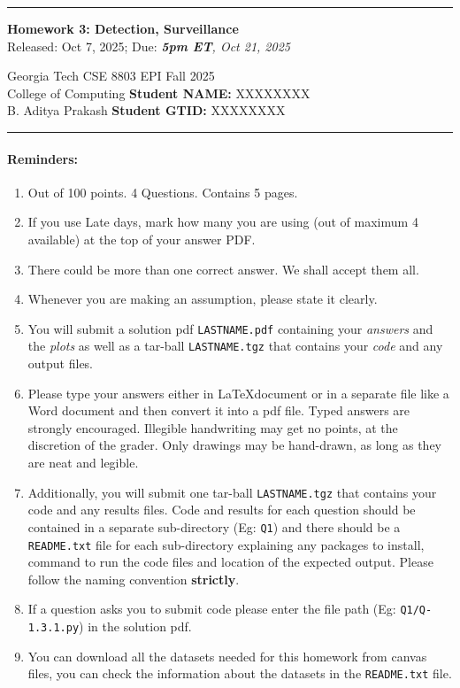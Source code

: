 \documentclass[addpoints,11pt,a4paper]{exam}
\begin{document}
\hrule height 1pt \vskip1pc
\begin{center}
    {\sf \LARGE \textbf{Homework 3: Detection, Surveillance}}\\
    Released: Oct 7, 2025; Due: \emph{{\bf 5pm ET}, Oct 21, 2025}
\end{center}

\noindent
{\sf Georgia Tech \hfill CSE 8803 EPI Fall 2025\\
    College of Computing \hfill {\bf Student NAME:} XXXXXXXX\\
    B. Aditya Prakash \hfill {\bf Student GTID:} XXXXXXXX}

\hrule height 1pt \vskip1pc



\paragraph{Reminders:}
{\it \footnotesize
    \begin{enumerate}
        \item Out of 100 points. 4 Questions. Contains 5 pages.

        \item If you use Late days, mark how many you are using (out of maximum 4 available) at the top of your answer PDF.
        \item There could be more than one correct answer. We shall accept them all.
        \item Whenever you are making an assumption, please state it clearly.
        \item You will submit a solution pdf \texttt{LASTNAME.pdf} containing your \emph{answers} and the \emph{plots} as well as a tar-ball  \texttt{LASTNAME.tgz} that contains your \emph{code} and any output files.
        \item Please type your answers either in \LaTeX document or in a separate file like a Word document and then convert it into a pdf file.
              Typed answers are strongly encouraged. Illegible handwriting may get no points, at the discretion of the grader. Only drawings may be hand-drawn, as long as they are neat and legible.
        \item Additionally, you will submit one tar-ball \texttt{LASTNAME.tgz} that contains your code and any results files. Code and results for each question should be contained in a separate sub-directory (Eg: \texttt{Q1}) and there should be a \texttt{README.txt} file for each sub-directory explaining any packages to install, command to run the code files and location of the expected output.
              Please follow the naming convention \textbf{strictly}.
        \item If a question asks you to submit code please enter the file path (Eg: \texttt{Q1/Q-1.3.1.py}) in the solution pdf.
        \item You can download all the datasets needed for this homework from canvas files, you can check the information about the datasets in the \texttt{README.txt} file.
    \end{enumerate}
}
\end{document}

